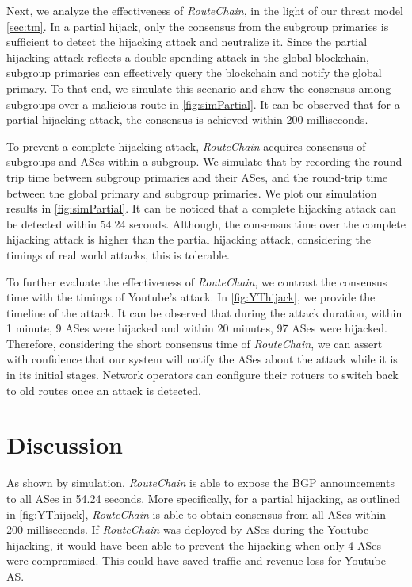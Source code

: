 \documentclass[conference]{IEEEtran}
\newcommand{\rc}{{{\em RouteChain}}\xspace}
\begin{document}
Next, we analyze the effectiveness of \rc, in the light of our threat model \textsection\ref{sec:tm}. In a  partial hijack, only the consensus from the subgroup primaries is sufficient to detect the hijacking attack and neutralize it. Since the partial hijacking attack reflects a double-spending attack in the global blockchain, subgroup primaries can effectively query the blockchain and notify the global primary. To that end, we simulate this scenario and show the consensus among subgroups over a malicious route in \autoref{fig:simPartial}. It can be observed that for a partial hijacking attack, the consensus is achieved within 200 milliseconds. 

To prevent a complete hijacking attack, \rc acquires consensus of subgroups and ASes within a subgroup. We simulate that by recording the round-trip time between subgroup primaries and their ASes, and the round-trip time between the global primary and subgroup primaries. We plot our simulation results in \autoref{fig:simPartial}. It can be noticed that a complete hijacking attack can be detected within 54.24 seconds. Although, the consensus time over the complete hijacking attack is higher than the partial hijacking attack, considering the timings of real world attacks, this is tolerable. 

To further evaluate the effectiveness of \rc, we contrast the consensus time with the timings of Youtube's attack. In \autoref{fig:YThijack}, we provide the timeline of the attack. It can be observed that during the attack duration, within 1 minute, 9 ASes were hijacked and within 20 minutes, 97 ASes were hijacked. Therefore, considering the short consensus time of \rc, we can assert with confidence that our system will notify the ASes about the attack while it is in its initial stages. Network operators can configure their rotuers to switch back to old routes once an attack is detected. 

\section{Discussion}\label{sec:discussion}
As shown by simulation, \rc is able to expose the BGP announcements to all ASes in 54.24 seconds. More specifically, for a partial hijacking, as outlined in \autoref{fig:YThijack}, \rc is able to obtain consensus from all ASes within 200 milliseconds. If \rc was deployed by ASes during the Youtube hijacking, it would have been able to prevent the hijacking when only 4 ASes were compromised. This could have saved traffic and revenue loss for Youtube AS. 
\end{document}
